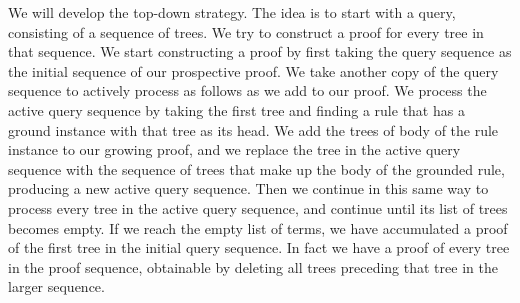 We will develop the top-down strategy.  The idea is to start with a
query, consisting of a sequence of trees.  We try to construct a proof
for every tree in that sequence.  We start constructing a proof by
first taking the query sequence as the initial sequence of our
prospective proof.  We take another copy of the query sequence to
actively process as follows as we add to our proof.  We process the
active query sequence by taking the first tree and finding a rule that
has a ground instance with that tree as its head.  We add the trees of
body of the rule instance to our growing proof, and we replace the
tree in the active query sequence with the sequence of trees that make
up the body of the grounded rule, producing a new active query
sequence.  Then we continue in this same way to process every tree in
the active query sequence, and continue until its list of trees
becomes empty.  If we reach the empty list of terms, we have
accumulated a proof of the first tree in the initial query sequence.
In fact we have a proof of every tree in the proof sequence,
obtainable by deleting all trees preceding that tree in the larger
sequence.

